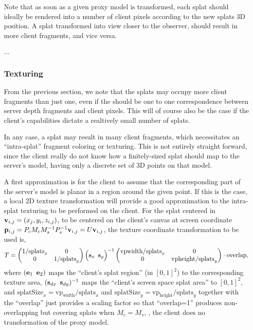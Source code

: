 Note that as soon as a given proxy model is transformed, each splat should
ideally be rendered into a number of client pixels according to the new splats
3D position. A splat transformed into view closer to the observer, should result
in more client fragments, and vice versa. 

...



\subsubsection{Texturing}

From the previous section, we note that the splats may occupy more client
fragments than just one, even if the should be one to one correspondence between
server depth fragments and client pixels. This will of course also be the case
if the client's capabilities dictate a realtively small number of splats.

In any case, a splat may result in many client fragments, which necessitates an
``intra-splat'' fragment coloring or texturing. This is not entirely straight
forward, since the client really do not know how a finitely-sized splat should
map to the server's model, having only a discrete set of 3D points on that
model.

\vspace{10cm}

A first approximation is for the client to assume that the corresponding part of
the server's model is planar in a region around the given point. If this is the
case, a local 2D texture transformation will provide a good approximation to the
intra-splat texturing to be performed on the client. For the splat centered in
$\mathbf{v}_{i, j} = (x_j, y_i, z_{i, j})$, to be centered on the client's canvas at
screen coordinate $\mathbf{p}_{i, j} = P_c M_c M_s^{-1} P_s^{-1}\mathbf{v}_{i, j} = U\mathbf{v}_{i,
j}$, the texture coordinate transformation to be used is,
\[
  T =
  \begin{pmatrix} 1/\text{splats}_x & 0 \\ 0 & 1/\text{splats}_y \end{pmatrix}
  \Big( \mathbf{s}_x \, \, \, \mathbf{s}_y \Big)^{-1}
  \begin{pmatrix} \text{vpwidth}/\text{splats}_x & 0 \\ 0 & \text{vpheight}/\text{splats}_y \end{pmatrix}
  \cdot \text{overlap},
\]
where $(\mathbf{e}_1 \, \, \, \mathbf{e}_2)$ maps the ``client's splat region'' (in $[0,
1]^2$) to the corresponding texture area, $(\mathbf{s}_{dx} \, \, \, \mathbf{s}_{dy})^{-1}$
maps the ``client's screen space splat area'' to $[0, 1]^2$, and $\text{splatSize}_x
= \text{vp}_\text{width}/\text{splats}_x$ and $\text{splatSize}_y
= \text{vp}_\text{height}/\text{splats}_y$ together with the ``overlap'' just
provides a scaling factor so that ``overlap=1'' produces non-overlapping but
covering splats when $M_c=M_s$, \ie, the client does no transformation of the
proxy model.

